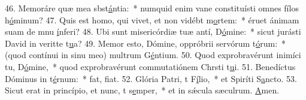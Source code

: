 46. Memoráre quæ mea sbst\uline{á}ntia:~* numquid enim vane constituísti omnes fílos h\uline{ó}minum?
47. Quis est homo, qui vivet, et non vidébt m\uline{o}rtem:~* éruet ánimam suam de mnu \uline{í}nferi?
48. Ubi sunt misericórdiæ tuæ antí, D\uline{ó}mine:~* sicut jurásti David in veritte t\uline{u}a?
49. Memor esto, Dómine, oppróbrii servórum t\uline{ó}rum:~* (quod contínui in sinu meo) multrum G\uline{é}ntium.
50. Quod exprobravérunt inimíci tu, D\uline{ó}mine,~* quod exprobravérunt commutatiónem Chrsti t\uline{u}i.
51. Benedíctus Dóminus in t\uline{é}rnum:~* fat, f\uline{i}at.
52. Glória Patri, t F\uline{í}lio,~* et Spiríti S\uline{a}ncto.
53. Sicut erat in princípio, et nunc, t s\uline{e}mper,~* et in sǽcula sæculrum. \uline{A}men.
